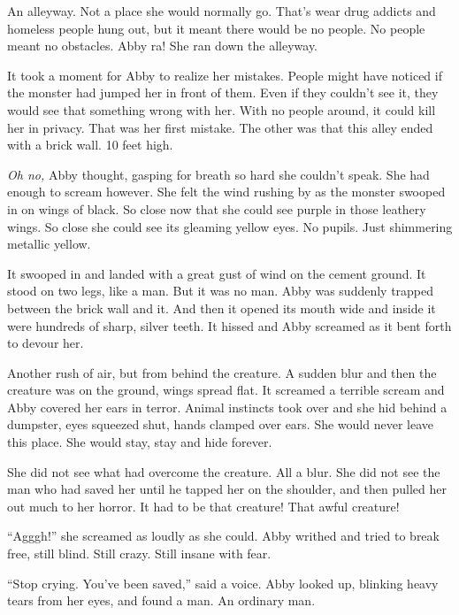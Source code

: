 An alleyway. Not a place she would normally go. That's wear drug
addicts and homeless people hung out, but it meant there would be
no people. No people meant no obstacles. Abby ra! She ran down the
alleyway.



It took a moment for Abby to realize her mistakes. People might
have noticed if the monster had jumped her in front of them. Even
if they couldn't see it, they would see that something wrong with
her. With no people around, it could kill her in privacy. That was
her first mistake. The other was that this alley ended with a brick
wall. 10 feet high.



{\em Oh no,} Abby thought, gasping for breath so hard she couldn't
speak. She had enough to scream however. She felt the wind rushing
by as the monster swooped in on wings of black. So close now that
she could see purple in those leathery wings. So close she could
see its gleaming yellow eyes. No pupils. Just shimmering metallic
yellow.



It swooped in and landed with a great gust of wind on the cement
ground. It stood on two legs, like a man. But it was no man. Abby
was suddenly trapped between the brick wall and it. And then it
opened its mouth wide and inside it were hundreds of sharp, silver
teeth. It hissed and Abby screamed as it bent forth to devour
her.



Another rush of air, but from behind the creature. A sudden blur
and then the creature was on the ground, wings spread flat. It
screamed a terrible scream and Abby covered her ears in terror.
Animal instincts took over and she hid behind a dumpster, eyes
squeezed shut, hands clamped over ears. She would never leave this
place. She would stay, stay and hide forever.



She did not see what had overcome the creature. All a blur. She did
not see the man who had saved her until he tapped her on the
shoulder, and then pulled her out much to her horror. It had to be
that creature! That awful creature!



``Agggh!'' she screamed as loudly as she could. Abby writhed and
tried to break free, still blind. Still crazy. Still insane with
fear.



``Stop crying. You've been saved,'' said a voice. Abby
looked up, blinking heavy tears from her eyes, and found a man. An
ordinary man.




